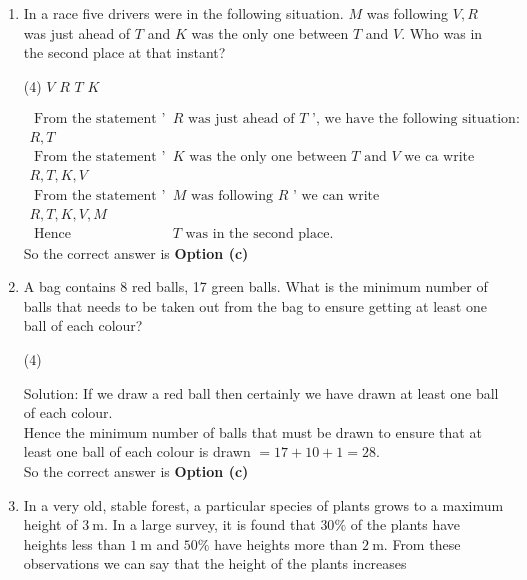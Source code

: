\begin{enumerate}
\begin{answer}
\end{answer}
\item  In a race five drivers were in the following situation. $M$ was following $V, R$ was just ahead of $T$ and $K$ was the only one between $T$ and $V$. Who was in the second place at that instant?
	 \begin{tasks}(4)
		\task[\textbf{a.}]$V$
		\task[\textbf{b.}]$R$
		\task[\textbf{c.}]$T$
		\task[\textbf{d.}]$K$ 
	\end{tasks}
\begin{answer}
	\begin{align*}
	\text { From the statement ' } &R \text { was just ahead of } T \text { ', we have the following situation: }\\
	R,T\\
	\text { From the statement ' } &K \text { was the only one between } T \text { and } V \text { we ca write }\\
	R,T,K,V\\
	\text { From the statement ' } &M \text { was following } R \text { ' we can write }\\
	R,T,K,V,M\\
	\text { Hence } &T \text { was in the second place. }
	\end{align*}
	So the correct answer is \textbf{Option (c)}
\end{answer}
\item  A bag contains 8 red balls, 17 green balls. What is the minimum number of balls that needs to be taken out from the bag to ensure getting at least one ball of each colour?
	 \begin{tasks}(4)
	\end{tasks}
\begin{answer}
Solution: If we draw a red ball then certainly we have drawn at least one ball of each colour.\\
Hence the minimum number of balls that must be drawn to ensure that at least one ball of each colour is drawn $=17+10+1=28$.\\
		So the correct answer is \textbf{Option (c)}
\end{answer}
\item  In a very old, stable forest, a particular species of plants grows to a maximum height of $3 \mathrm{~m}$. In a large survey, it is found that $30 \%$ of the plants have heights less than $1 \mathrm{~m}$ and $50 \%$ have heights more than $2 \mathrm{~m}$. From these observations we can say that the height of the plants increases

\end{enumerate}

